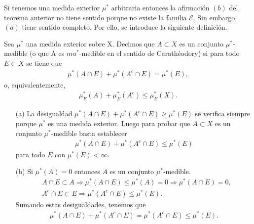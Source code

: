 \begin{obs}
    Si tenemos una medida exterior $\mu^*$ arbitraria entonces la afirmación $(b)$ del teorema anterior no tiene sentido porque no existe la familia $\mathcal{E}$. Sin embargo, $(a)$ tiene sentido completo. Por ello, se introduce la siguiente definición.
\end{obs}

\begin{defi}
    Sea $\mu^*$ una medida exterior sobre X. Decimos que $A \subset X$ es un conjunto $\mu^*$-medible (o que A es $mu^*$-medible en el sentido de Carathéodory) si para todo $E \subset X$ se tiene que
    \begin{align*}
        \mu^*(A \cap E) + \mu^*(A^c \cap E) = \mu^*(E),
    \end{align*}
    o, equivalentemente,
    \begin{align*}
        \mu_{E}^*(A) + \mu_{E}^*(A^c) \leq \mu_{E}^*(X).
    \end{align*}
\end{defi}

\begin{obs}
    \begin{enumerate}
        \item[(a)] La desigualdad $\mu^*(A \cap E) + \mu^*(A^c \cap E) \ge \mu^*(E)$ se verifica siempre porque $\mu^*$ es una medida exterior. Luego para probar que $A \subset X$ es un conjunto $\mu^*$-medible basta establecer
              \begin{align*}
                  \mu^*(A \cap E) + \mu^*(A^c \cap E) \leq \mu^*(E)
              \end{align*}
              para todo $E$ con $\mu^*(E) < \infty$.
        \item[(b)] Si $\mu^*(A) = 0$ entonces $A$ es un conjunto $\mu^*$-medible.
              \begin{align*}
                   & A \cap E \subset A \Longrightarrow \mu^*(A \cap E) \leq \mu^*(A) = 0 \Longrightarrow \mu^*(A \cap E) = 0, \\
                   & A^c \cap E \subset E \Longrightarrow \mu^*(A^c \cap E) \leq \mu^*(E).
              \end{align*}
              Sumando estas desigualdades, tenemos que
              \begin{align*}
                  \mu^*(A \cap E) + \mu^*(A^c \cap E) = \mu^*(A^c \cap E) \leq \mu^*(E).
              \end{align*}
    \end{enumerate}
\end{obs}

